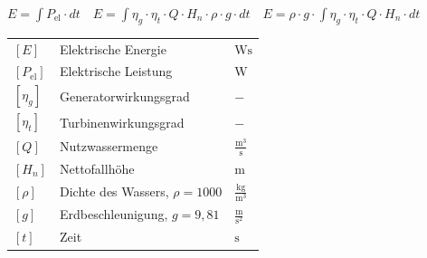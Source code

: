 $
\boxed{E = \int P_{\text{el}} \cdot dt}
\quad
\boxed{E = \int \eta_g \cdot \eta_t \cdot Q \cdot H_n \cdot \rho \cdot g \cdot dt}
\quad
\boxed{E = \rho \cdot g \cdot \int \eta_g \cdot \eta_t \cdot Q \cdot H_n \cdot dt}
$

\vspace{0.15cm}

\renewcommand{\arraystretch}{1.2}
\begin{tabular}{@{} l p{6cm} l @{}}
    $[E]$               & Elektrische Energie \dotfill                           & $\text{Ws}$ \\
    $[P_{\text{el}}]$   & Elektrische Leistung \dotfill                          & $\text{W}$ \\
    $[\eta_g]$          & Generatorwirkungsgrad \dotfill                         & $-$ \\
    $[\eta_t]$          & Turbinenwirkungsgrad \dotfill                          & $-$ \\
    $[Q]$               & Nutzwassermenge \dotfill                               & $\frac{\text{m}^3}{\text{s}}$ \\
    $[H_n]$             & Nettofallhöhe \dotfill                                 & $\text{m}$ \\
    $[\rho]$            & Dichte des Wassers, $\rho = 1000$ \dotfill             & $\frac{\text{kg}}{\text{m}^3}$ \\
    $[g]$               & Erdbeschleunigung, $g = 9{,}81$ \dotfill               & $\frac{\text{m}}{\text{s}^2}$ \\
    $[t]$               & Zeit \dotfill                                           & $\text{s}$ \\
\end{tabular}

























































